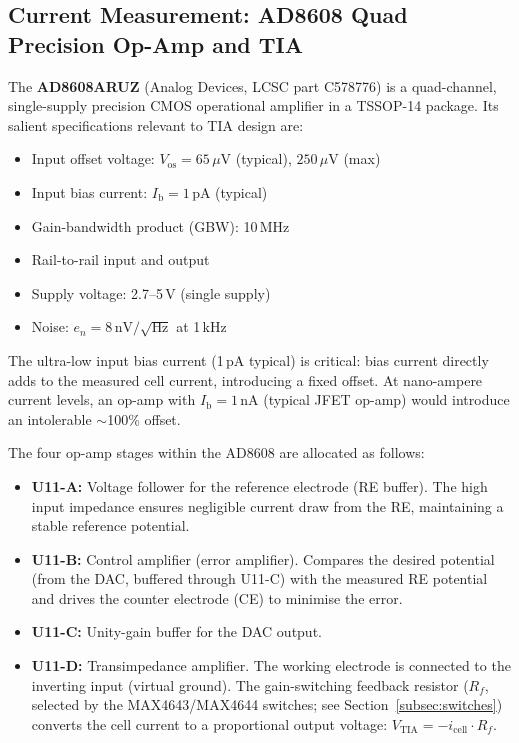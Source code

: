 \subsection{Current Measurement: AD8608 Quad Precision Op-Amp and TIA}
\label{subsec:opamp}

The \textbf{AD8608ARUZ} (Analog Devices, LCSC part C578776) is a quad-channel, single-supply precision CMOS operational amplifier in a TSSOP-14 package. Its salient specifications relevant to TIA design are:
\begin{itemize}
    \item Input offset voltage: $V_\mathrm{os} = 65\,\mu\text{V}$ (typical), $250\,\mu\text{V}$ (max)
    \item Input bias current: $I_\mathrm{b} = 1\,\text{pA}$ (typical)
    \item Gain-bandwidth product (GBW): 10\,MHz
    \item Rail-to-rail input and output
    \item Supply voltage: 2.7--5\,V (single supply)
    \item Noise: $e_n = 8\,\text{nV}/\sqrt{\text{Hz}}$ at 1\,kHz
\end{itemize}
The ultra-low input bias current (1\,pA typical) is critical: bias current directly adds to the measured cell current, introducing a fixed offset. At nano-ampere current levels, an op-amp with $I_\mathrm{b} = 1$\,nA (typical JFET op-amp) would introduce an intolerable $\sim$100\% offset.

The four op-amp stages within the AD8608 are allocated as follows:
\begin{itemize}
    \item \textbf{U11-A:} Voltage follower for the reference electrode (RE buffer). The high input impedance ensures negligible current draw from the RE, maintaining a stable reference potential.
    \item \textbf{U11-B:} Control amplifier (error amplifier). Compares the desired potential (from the DAC, buffered through U11-C) with the measured RE potential and drives the counter electrode (CE) to minimise the error.
    \item \textbf{U11-C:} Unity-gain buffer for the DAC output.
    \item \textbf{U11-D:} Transimpedance amplifier. The working electrode is connected to the inverting input (virtual ground). The gain-switching feedback resistor ($R_f$, selected by the MAX4643/MAX4644 switches; see Section~\ref{subsec:switches}) converts the cell current to a proportional output voltage: $V_\mathrm{TIA} = -i_\mathrm{cell} \cdot R_f$.
\end{itemize}

